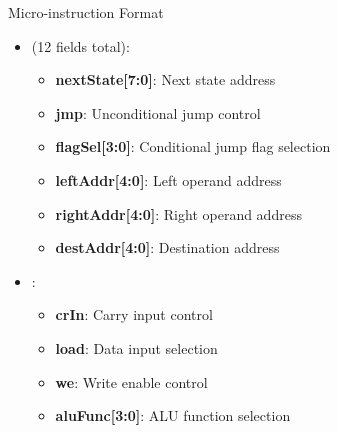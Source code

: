 \begin{frame}{Micro-instruction Format}
\begin{itemize}
\item {} (12 fields total):
\begin{itemize}
\item \textbf{nextState[7:0]}: Next state address
\item \textbf{jmp}: Unconditional jump control
\item \textbf{flagSel[3:0]}: Conditional jump flag selection
\item \textbf{leftAddr[4:0]}: Left operand address
\item \textbf{rightAddr[4:0]}: Right operand address
\item \textbf{destAddr[4:0]}: Destination address
\end{itemize}
\vspace{0.3cm}
\item {}:
\begin{itemize}
\item \textbf{crIn}: Carry input control
\item \textbf{load}: Data input selection
\item \textbf{we}: Write enable control
\item \textbf{aluFunc[3:0]}: ALU function selection
\end{itemize}
\end{itemize}
\end{frame}

